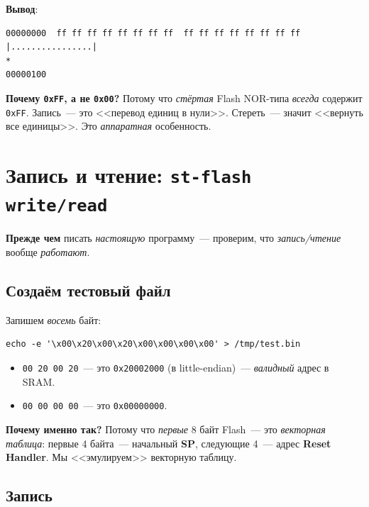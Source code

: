 \textbf{Вывод}:

\begin{verbatim}
00000000  ff ff ff ff ff ff ff ff  ff ff ff ff ff ff ff ff  |................|
*
00000100
\end{verbatim}

\begin{ideabox}
\textbf{Почему \texttt{0xFF}, а не \texttt{0x00}?} Потому
что \emph{стёртая} Flash NOR-типа \emph{всегда} содержит
\texttt{0xFF}. Запись~--- это <<перевод единиц в нули>>.
Стереть~--- значит <<вернуть все единицы>>. Это
\emph{аппаратная} особенность.
\end{ideabox}

\section{Запись и чтение: \texttt{st-flash write/read}}
\label{sec:flashing-write}

\textbf{Прежде чем} писать \emph{настоящую} программу~---
проверим, что \emph{запись/чтение} вообще \emph{работают}.

\subsection{Создаём тестовый файл}

Запишем \emph{восемь} байт:

\begin{verbatim}
echo -e '\x00\x20\x00\x20\x00\x00\x00\x00' > /tmp/test.bin
\end{verbatim}

\begin{itemize}
    \item \texttt{00 20 00 20}~--- это \texttt{0x20002000}
          (в little-endian)~--- \emph{валидный} адрес в SRAM.
    \item \texttt{00 00 00 00}~--- это \texttt{0x00000000}.
\end{itemize}

\textbf{Почему именно так?} Потому что \emph{первые}
8 байт Flash~--- это \emph{векторная таблица}:
первые 4 байта~--- начальный \textbf{SP}, следующие
4~--- адрес \textbf{Reset Handler}. Мы <<эмулируем>>
векторную таблицу.

\subsection{Запись}


